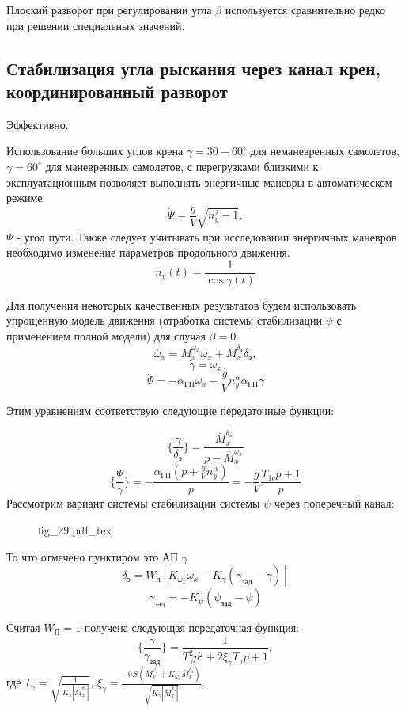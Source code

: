 \documentclass{article}
\begin{document}
Плоский разворот при регулировании угла $\beta$ используется сравнительно редко
при решении специальных значений.

\subsection{Стабилизация угла рыскания через канал крен, координированный
разворот}
Эффективно.


Использование больших углов крена $\gamma = 30 - 60^\circ$ для неманевренных
самолетов, $\gamma = 60^\circ$ для маневренных самолетов, с перегрузками
близкими к эксплуатационным позволяет выполнять энергичные маневры в
автоматическом режиме.
\[
    \dot{\Psi} =\frac{g}{V} \sqrt{n_y^2 -1},
\]
$\Psi$ - угол пути. Также следует учитывать при исследовании энергичных
маневров необходимо изменение параметров продольного движения.
\[
    n_y(t) =\frac{1}{\cos{\gamma(t)}}
\]

Для получения некоторых качественных результатов будем использовать упрощенную
модель движения (отработка системы стабилизации $\psi$ с применением полной
модели) для случая $\beta = 0$.
\[
    \dot{\omega_x} =\bar{M}_x^{\omega_x} \omega_x
    +\bar{M}_{x}^{\delta_\text{э}} \delta_\text{э},
\]
\[
    \dot{\gamma} = \omega_x
\]
\[
    \dot{\Psi} = - \alpha_\text{ГП}\omega_x - \frac{g}{V} n_y^\alpha
    \alpha_\text{ГП}\gamma
\]

Этим уравнениям соответствую следующие передаточные функции:

\[
    \{\frac{\gamma}{\delta_\text{э}} \} =\frac{\bar{M}_{x}^{\delta_\text{э}}}{p
    -\bar{M}_x^{\omega_x}}
\]
\[
    \{\frac{\Psi}{\gamma}\} = - \frac{\alpha_\text{ГП} (p +
    \frac{g}{V}n_y^\alpha)}{p} = -\frac{g}{V} \frac{T_{1c}p + 1}{p}
\]
Рассмотрим вариант системы стабилизации системы $\psi$ через поперечный канал:

\begin{figure}[H]
    \centering
    {fig_29.pdf_tex}
\end{figure}

То что отмечено пунктиром это АП $\gamma$
\[
    \delta_\text{э} = W_\text{п}[K_{\omega_x}\omega_x -
    K_{\gamma}(\gamma_\text{зад} - \gamma)]
\]
\[
    \gamma_\text{зад} = -K_{\psi}(\psi_\text{зад} - \psi)
\]

Считая $W_\text{П} = 1$ получена следующая передаточная функция:
\[
    \{\frac{\gamma}{\gamma_\text{зад}} \}=\frac{1}{T_{\gamma}^2 p^2 + 2
    \xi_{\gamma} T_\gamma p + 1},
\]
где $T_{\gamma} = \sqrt{\frac{1}{K_{\gamma}|\bar{M}_x^{\delta_\text{э}}|}}$,
$\xi_{\gamma} =\frac{-0.8(\bar{M}_x^{\omega_x} + K_{\omega_x}
\bar{M}_x^{\delta_\text{э}})}{\sqrt{K_\gamma |\bar{M}_x^{\delta_\text{э}}|}}$.
\end{document}
